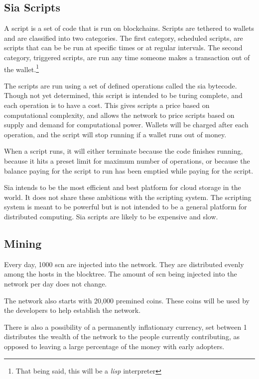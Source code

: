 \documentclass[a4paper,10pt]{article}
\begin{document}
\subsection{Sia Scripts}
\par
	A script is a set of code that is run on blockchains. Scripts are 
tethered to wallets and are classified into two categories. The first category, 
scheduled scripts, are scripts that can be be run at specific times or at 
regular intervals. The second category, triggered scripts, are run any time 
someone makes a transaction out of the wallet.\footnote{That being said, this 
will be a \emph{lisp} interpreter}
\par
The scripts are run using a set of defined operations called the sia bytecode. 
Though not yet determined, this script is intended to be turing complete, and 
each operation is to have a cost. This gives scripts a price based on 
computational complexity, and allows the network to price scripts based on 
supply and demand for computational power. Wallets will be charged after each 
operation, and the script will stop running if a wallet runs out of money.
\par
When a script runs, it will either terminate because the code finishes running, 
because it hits a preset limit for maximum number of operations, or because the 
balance paying for the script to run has been emptied while paying for the 
script.
\par
Sia intends to be the most efficient and best platform for cloud storage in the 
world. It does not share these ambitions with the scripting system. The 
scripting system is meant to be powerful but is not intended to be a general 
platform for distributed computing. Sia scripts are likely to be expensive and 
slow.
\subsection{Mining}
Every day, 1000 scn are injected into the network. They are distributed evenly 
among the hosts in the blocktree. The amount of scn being injected into the 
network per day does not change.
\par
The network also starts with 20,000 premined coins. These coins will be 
used by the developers to help establish the network.
\par
There is also a possibility of a permanently inflationary currency, set 
between 1%
distributes the wealth of the network to the people currently contributing, as 
opposed to leaving a large percentage of the money with early adopters.
\end{document}
